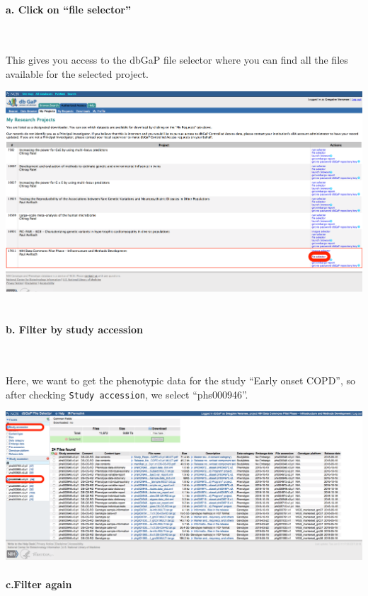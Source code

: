 \documentclass[11pt]{article}
\makeatletter
\def\maxwidth{\ifdim\Gin@nat@width>\linewidth\linewidth
    \else\Gin@nat@width\fi}
\let\Oldincludegraphics\includegraphics
\renewcommand{\includegraphics}[1]{\Oldincludegraphics[width=.8\maxwidth]{#1}}
\makeatother
\begin{document}
\hypertarget{a.-click-on-file-selector}{%
\paragraph{a. Click on ``file
selector''}\label{a.-click-on-file-selector}}
\ 

This gives you access to the dbGaP file selector where you can find all
the files available for the selected project.
\ 

\includegraphics{Screenshots/Screen41.png}
\ 

\hypertarget{b.-filter-by-study-accession}{%
\paragraph{b. Filter by study accession}\label{b.-filter-by-study-accession}}
\ 

Here, we want to get the phenotypic data for the study ``Early
onset COPD'', so after checking \texttt{Study\ accession}, we select
``phs000946''.
\ 

\includegraphics{Screenshots/Screen51.png}

\hypertarget{c-filter-again}{%
\paragraph{c.Filter again}\label{c-filter-again}}
\ 
\end{document}
